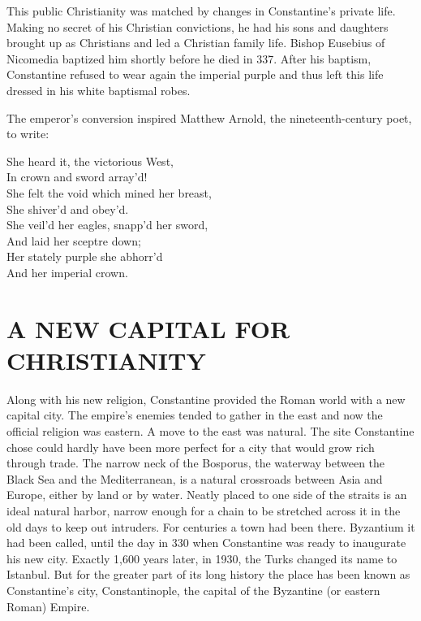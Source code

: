 This public Christianity was matched by changes in Constantine’s private life. Making no secret of
his Christian convictions, he had his sons and daughters brought up as Christians and led a
Christian family life. Bishop Eusebius of Nicomedia baptized him shortly before he died in 337.
After his baptism, Constantine refused to wear again the imperial purple and thus left this life
dressed in his white baptismal robes.

The emperor’s conversion inspired Matthew Arnold, the nineteenth-century poet, to write:

\begin{poem}
She heard it, the victorious West,\\
In crown and sword array’d!\\
She felt the void which mined her breast,\\
She shiver’d and obey’d.\\
She veil’d her eagles, snapp’d her sword,\\
And laid her sceptre down;\\
Her stately purple she abhorr’d\\
And her imperial crown.
\end{poem}

\section{A NEW CAPITAL FOR CHRISTIANITY}

Along with his new religion, Constantine provided the Roman world with a new capital city. The
empire’s enemies tended to gather in the east and now the official religion was eastern. A move to
the east was natural. The site Constantine chose could hardly have been more perfect for a city that
would grow rich through trade. The narrow neck of the Bosporus, the waterway between the Black Sea
and the Mediterranean, is a natural crossroads between Asia and Europe, either by land or by water.
Neatly placed to one side of the straits is an ideal natural harbor, narrow enough for a chain to be
stretched across it in the old days to keep out intruders. For centuries a town had been there.
Byzantium it had been called, until the day in 330 when Constantine was ready to inaugurate his new
city. Exactly 1,600 years later, in 1930, the Turks changed its name to Istanbul. But for the
greater part of its long history the place has been known as Constantine’s city, Constantinople, the
capital of the Byzantine (or eastern Roman) Empire.


